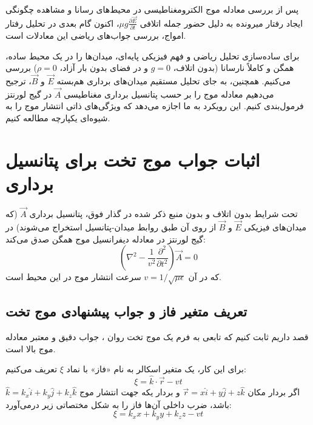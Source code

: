 \documentclass[12pt,a4paper]{article}
\begin{document}
\vspace{0.5cm}
\begin{tcolorbox}[colback=gray!8, colframe=gray!75, title=\textbf{گذار مفهومی ۱: عبور از اتلاف و گذار به پتانسیل برداری}]
پس از بررسی معادله موج الکترومغناطیسی در محیط‌های رسانا و مشاهده چگونگی ایجاد رفتار میرونده به دلیل حضور جمله اتلافی $\mu g \frac{\partial \vec{E}}{\partial t}$، اکنون گام بعدی در تحلیل رفتار امواج، بررسی جواب‌های ریاضی این معادلات است.

برای ساده‌سازی تحلیل ریاضی و فهم فیزیکی پایه‌ای، میدان‌ها را در یک محیط ساده، همگن و کاملاً نارسانا (بدون اتلاف، $g=0$ و در فضای بدون بار آزاد، $\rho=0$) بررسی می‌کنیم. همچنین، به جای تحلیل مستقیم میدان‌های برداری هم‌بسته $\vec{E}$ و $\vec{B}$، ترجیح می‌دهیم معادله موج را بر حسب پتانسیل برداری مغناطیسی $\vec{A}$ در گیج لورنتز فرمول‌بندی کنیم. این رویکرد به ما اجازه می‌دهد که ویژگی‌های ذاتی انتشار موج را به شیوه‌ای یکپارچه مطالعه کنیم.
\end{tcolorbox}
\vspace{0.5cm}

\section{اثبات جواب موج تخت برای پتانسیل برداری}
تحت شرایط بدون اتلاف و بدون منبع ذکر شده در گذار فوق، پتانسیل برداری $\vec{A}$ (که میدان‌های فیزیکی $\vec{E}$ و $\vec{B}$ از روی آن طبق روابط میدان-پتانسیل استخراج می‌شوند) در گیج لورنتز در معادله دیفرانسیل موج همگن صدق می‌کند:
\begin{equation} \label{eq:wave_pot}
    \left( \nabla^2 - \frac{1}{v^2} \frac{\partial^2}{\partial t^2} \right) \vec{A} = 0
\end{equation}
که در آن $v = 1/\sqrt{\mu\epsilon}$ سرعت انتشار موج در این محیط است.

\subsection{تعریف متغیر فاز و جواب پیشنهادی موج تخت}
قصد داریم ثابت کنیم که تابعی به فرم یک موج تخت روان ، جواب دقیق و معتبر معادله موج بالا است.

برای این کار، یک متغیر اسکالر به نام «فاز» با نماد $\xi$ تعریف می‌کنیم:
\begin{equation}
    \xi = \hat{k} \cdot \vec{r} - vt
\end{equation}
اگر بردار مکان $\vec{r} = x\hat{i} + y\hat{j} + z\hat{k}$ و بردار یکه جهت انتشار موج $\hat{k} = k_x\hat{i} + k_y\hat{j} + k_z\hat{k}$ باشد، ضرب داخلی آن‌ها فاز را به شکل مختصاتی زیر درمی‌آورد:
\begin{equation}
    \xi = k_x x + k_y y + k_z z - vt
\end{equation}
\end{document}
